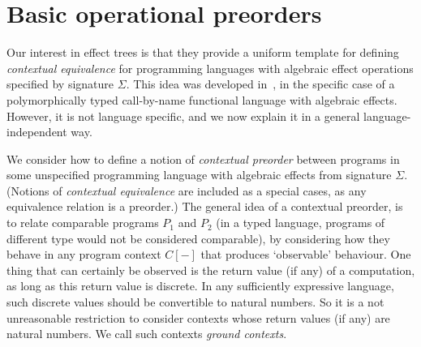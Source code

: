 \section{Basic operational preorders}

Our interest in effect trees is that they provide a 
uniform template for defining 
 \emph{contextual equivalence} for programming languages with algebraic effect operations
specified by signature $\Sigma$. This idea was developed in~\cite{gom}, in the specific case of a polymorphically typed call-by-name functional language with algebraic effects. However, it is not language specific, and we now explain it in a general language-independent way.

We consider how to define a notion of \emph{contextual preorder} between programs in some unspecified programming language with algebraic effects from signature $\Sigma$. (Notions of \emph{contextual equivalence}
are included as a special cases, as any equivalence relation is a preorder.) The general idea of a contextual preorder, is to relate comparable programs $P_1$ and $P_2$ (in a typed language, programs of different type would not be considered comparable), by considering how they behave in any program context $C[-]$ that produces `observable' behaviour. One thing that can certainly be observed is the return value (if any) of a computation, as long as this return value is discrete. In any sufficiently expressive language, such discrete values should be convertible to natural numbers. So it is a not unreasonable  restriction to consider contexts whose return values (if any) are natural numbers.  We call such contexts \emph{ground contexts}.


